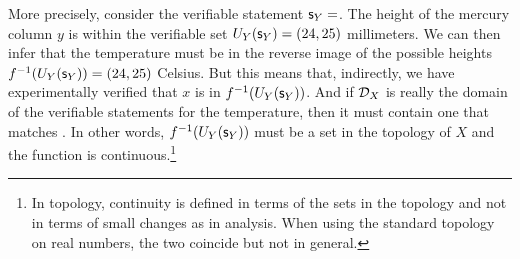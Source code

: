 More precisely, consider the verifiable statement $\mathsf{s}_Y=$. The height of the mercury column $y$ is within the verifiable set $U_Y(\mathsf{s}_Y) = (24, 25)$ millimeters. We can then infer that the temperature must be in the reverse image of the possible heights $f^{-1}(U_Y(\mathsf{s}_Y))=(24,25)$ Celsius. But this means that, indirectly, we have experimentally verified that $x$ is in $f^{-1}(U_Y(\mathsf{s}_Y))$. And if $\mathcal{D}_X$ is really the domain of the verifiable statements for the temperature, then it must contain one that matches . In other words, $f^{-1}(U_Y(\mathsf{s}_Y))$ must be a set in the topology of $X$ and the function is continuous.\footnote{In topology, continuity is defined in terms of the sets in the topology and not in terms of small changes as in analysis. When using the standard topology on real numbers, the two coincide but not in general.}

